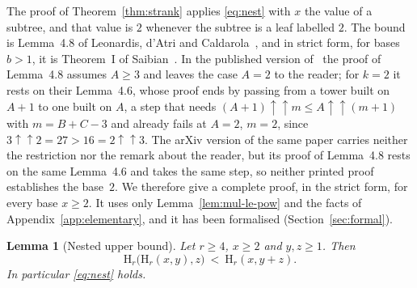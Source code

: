 \documentclass[11pt,a4paper]{article}
\theoremstyle{plain}
\newtheorem{lemma}[theorem]{Lemma}
\theoremstyle{definition}
\newcommand{\HH}{\mathrm{H}}
\newcommand{\tw}{\uparrow\uparrow}
\begin{document}
The proof of Theorem~\ref{thm:strank} applies \eqref{eq:nest} with $x$ the value of a
subtree, and that value is $2$ whenever the subtree is a leaf labelled $2$. The bound is
Lemma~4.8 of Leonardis, d'Atri and Caldarola~\cite{LdC}, and in strict form, for bases
$b>1$, it is Theorem~I of Saibian~\cite{Sai}. In the published version of~\cite{LdC} the proof of
Lemma~4.8 assumes $A\ge3$ and leaves the case $A=2$ to the reader; for $k=2$ it rests on
their Lemma~4.6, whose proof ends by passing from a tower built on $A+1$ to one built on
$A$, a step that needs $(A+1)\tw m\le A\tw(m+1)$ with $m=B+C-3$ and already fails at
$A=2$, $m=2$, since $3\tw2=27>16=2\tw3$. The arXiv version of the same paper carries
neither the restriction nor the remark about the reader, but its proof of Lemma~4.8 rests
on the same Lemma~4.6 and takes the same step, so neither printed proof establishes the
base~$2$. We therefore give a complete proof, in the
strict form, for every base $x\ge2$. It uses only Lemma~\ref{lem:mul-le-pow} and the
facts of Appendix~\ref{app:elementary}, and it has been formalised
(Section~\ref{sec:formal}).

\begin{lemma}[Nested upper bound]\label{lem:nest}
Let $r\ge4$, $x\ge2$ and $y,z\ge1$. Then
\[
  \HH_r\bigl(\HH_r(x,y),z\bigr)\ <\ \HH_r(x,y+z).
\]
In particular \eqref{eq:nest} holds.
\end{lemma}
\end{document}
